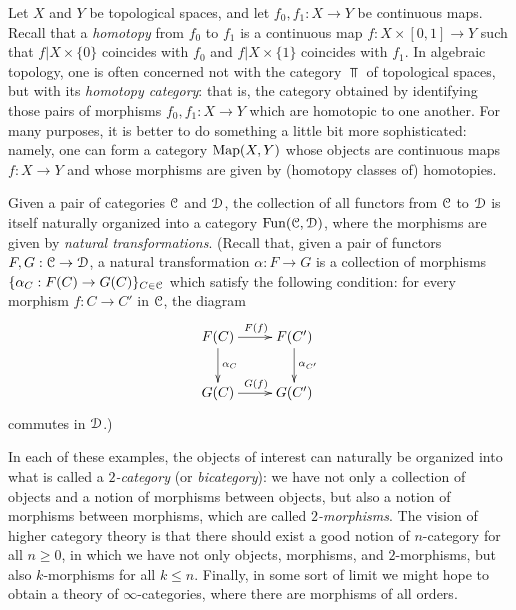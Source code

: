 \begin{1.1.1 Goals and Obstacles}
\begin{example}\label{2cat2}
Let $X$ and $Y$ be topological spaces, and let $f_0, f_1: X \rightarrow Y$ be continuous maps.
Recall that a {\it homotopy} from $f_0$ to $f_1$ is a continuous map $f: X \times [0,1] \rightarrow Y$
such that $f | X \times \{0\}$ coincides with $f_0$ and $f | X \times \{1\}$ coincides with $f_1$.
In algebraic topology, one is often concerned not with the category $\Top$ of topological spaces,
but with its {\it homotopy category}: that is, the category obtained by identifying those pairs of
morphisms $f_0, f_1: X \rightarrow Y$ which are homotopic to one another. For many purposes, it is better to do something a little bit more sophisticated: namely, one can form a category
$\operatorname{{Map}}(X,Y)$ whose objects are continuous maps $f: X \rightarrow Y$ and whose morphisms
are given by (homotopy classes of) homotopies.
\end{example}

\begin{example}\label{2cat3}
Given a pair of categories $\operatorname{\mathcal{C}}$ and $\operatorname{\mathcal{D}}$, the collection of all functors from
$\operatorname{\mathcal{C}}$ to $\operatorname{\mathcal{D}}$ is itself naturally organized into a category $\operatorname{Fun}( \operatorname{\mathcal{C}}, \operatorname{\mathcal{D}})$, where
the morphisms are given by {\it natural transformations}. (Recall that, given a pair of functors
$F,G: \operatorname{\mathcal{C}} \rightarrow \operatorname{\mathcal{D}}$, a natural transformation $\alpha: F \rightarrow G$ is a collection
of morphisms $\{ \alpha_{C}: F(C) \rightarrow G(C) \}_{C \in \operatorname{\mathcal{C}}}$ which satisfy the following
condition: for every morphism $f: C \rightarrow C'$ in $\operatorname{\mathcal{C}}$, the diagram
$$ \xymatrix{ F(C) \ar[r]^{F(f)} \ar[d]^{\alpha_C} & F(C') \ar[d]^{\alpha_{C'} } \\
G(C) \ar[r]^{G(f)} & G(C') }$$
commutes in $\operatorname{\mathcal{D}}$.)
\end{example}

In each of these examples, the objects of interest can naturally be organized into what is
called a {\it $2$-category} (or {\it bicategory}): we have not only a collection of objects and a notion of morphisms between objects, but also a notion of morphisms between morphisms, which
are called {\it $2$-morphisms}. The vision of higher category theory is that there should exist a good notion of $n$-category for all $n \geq 0$, in which we have not only objects,
morphisms, and $2$-morphisms, but also $k$-morphisms for all $k
\leq n$. Finally, in some sort of limit we might hope to obtain a theory
of $\infty$-categories, where there are morphisms of all orders.


\end{1.1.1 Goals and Obstacles}
